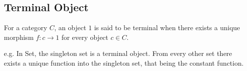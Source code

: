\subsection{Terminal Object}

For a category $C$, an object $1$ is said to be terminal when there exists a
unique morphism $f: c\to 1$ for every object $c\in C$.
\cite{awodey:category_theory}

e.g. In Set, the singleton set is a terminal object. From every other set
there exists a unique function into the singleton set, that being the constant
function.